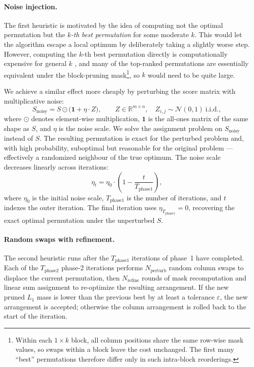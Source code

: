 \paragraph{Noise injection.}
The first heuristic is motivated by the idea of computing not the optimal permutation but the \emph{$k$-th best permutation} for some moderate $k$. This would let the algorithm escape a local optimum by deliberately taking a slightly worse step. However, computing the $k$-th best permutation directly is computationally expensive for general $k$ \cite{CHEGIREDDY1987155}, and many of the top-ranked permutations are essentially equivalent under the block-pruning mask\footnote{Within each $1 \times k$ block, all column positions share the same row-wise mask values, so swaps within a block leave the cost unchanged. The first many ``best'' permutations therefore differ only in such intra-block reorderings.}, so $k$ would need to be quite large.

We achieve a similar effect more cheaply by perturbing the score matrix with multiplicative noise:
$$ S_\mathrm{noisy} = S \odot \bigl(\mathbf{1} + \eta \cdot Z\bigr), \qquad Z \in \mathbb{R}^{m \times n}, \quad Z_{i, j} \sim \mathcal{N}(0, 1)\ \text{i.i.d.}, $$
where $\odot$ denotes element-wise multiplication, $\mathbf{1}$ is the all-ones matrix of the same shape as $S$, and $\eta$ is the noise scale. We solve the assignment problem on $S_\mathrm{noisy}$ instead of $S$. The resulting permutation is exact for the perturbed problem and, with high probability, suboptimal but reasonable for the original problem --- effectively a randomized neighbour of the true optimum. The noise scale decreases linearly across iterations:
$$ \eta_t = \eta_0 \cdot \left(1 - \frac{t}{T_\mathrm{phase1}}\right), $$
where $\eta_0$ is the initial noise scale, $T_\mathrm{phase1}$ is the number of iterations, and $t$ indexes the outer iteration. The final iteration uses $\eta_{T_\mathrm{phase1}} = 0$, recovering the exact optimal permutation under the unperturbed $S$.

\paragraph{Random swaps with refinement.}
The second heuristic runs after the $T_\mathrm{phase1}$ iterations of phase~1 have completed. Each of the $T_\mathrm{phase2}$ phase-2 iterations performs $N_\mathrm{perturb}$ random column swaps to displace the current permutation, then $N_\mathrm{refine}$ rounds of mask recomputation and linear sum assignment to re-optimize the resulting arrangement. If the new pruned $L_1$ mass is lower than the previous best by at least a tolerance $\varepsilon$, the new arrangement is accepted; otherwise the column arrangement is rolled back to the start of the iteration.

